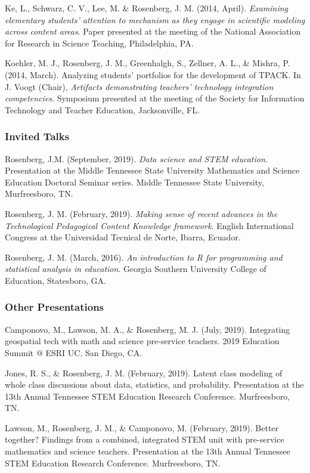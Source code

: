 \documentclass[14,]{article}
\begin{document}
Ke, L., Schwarz, C. V., Lee, M. \& Rosenberg, J. M. (2014, April).
\emph{Examining elementary students' attention to mechanism as they
engage in scientific modeling across content areas}. Paper presented at
the meeting of the National Association for Research in Science
Teaching, Philadelphia, PA.

Koehler, M. J., Rosenberg, J. M., Greenhalgh, S., Zellner, A. L., \&
Mishra, P. (2014, March). Analyzing students' portfolios for the
development of TPACK. In J. Voogt (Chair), \emph{Artifacts demonstrating
teachers' technology integration competencies}. Symposium presented at
the meeting of the Society for Information Technology and Teacher
Education, Jacksonville, FL.

\subsubsection{Invited Talks}\label{invited-talks}

Rosenberg, J.M. (September, 2019). \emph{Data science and STEM
education}. Presentation at the Middle Tennessee State University
Mathematics and Science Education Doctoral Seminar series. Middle
Tennessee State University, Murfreesboro, TN.

Rosenberg, J. M. (February, 2019). \emph{Making sense of recent advances
in the Technological Pedagogical Content Knowledge framework}. English
International Congress at the Universidad Tecnical de Norte, Ibarra,
Ecuador.

Rosenberg, J. M. (March, 2016). \emph{An introduction to R for
programming and statistical analysis in education}. Georgia Southern
University College of Education, Statesboro, GA.

\subsubsection{Other Presentations}\label{other-presentations}

Camponovo, M., Lawson, M. A., \& Rosenberg, M. J. (July, 2019).
Integrating geospatial tech with math and science pre-service teachers.
2019 Education Summit @ ESRI UC. San Diego, CA.

Jones, R. S., \& Rosenberg, J. M. (February, 2019). Latent class
modeling of whole class discussions about data, statistics, and
probability. Presentation at the 13th Annual Tennessee STEM Education
Research Conference. Murfreesboro, TN.

Lawson, M., Rosenberg, J. M., \& Camponovo, M. (February, 2019). Better
together? Findings from a combined, integrated STEM unit with
pre-service mathematics and science teachers. Presentation at the 13th
Annual Tennessee STEM Education Research Conference. Murfreesboro, TN.
\end{document}
